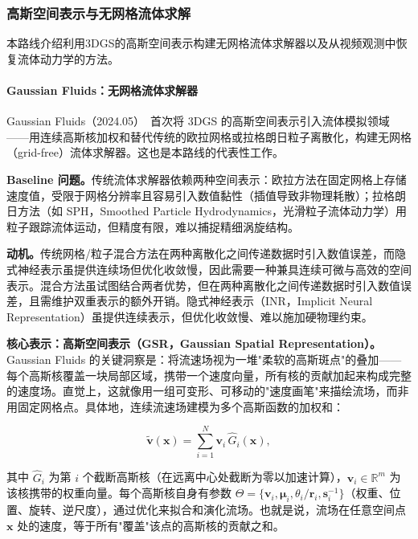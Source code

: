 \subsubsection{高斯空间表示与无网格流体求解}

本路线介绍利用3DGS的高斯空间表示构建无网格流体求解器以及从视频观测中恢复流体动力学的方法。

\paragraph{Gaussian Fluids：无网格流体求解器}

Gaussian Fluids（2024.05）~\cite{2405_18133}首次将 3DGS 的高斯空间表示引入流体模拟领域——用连续高斯核加权和替代传统的欧拉网格或拉格朗日粒子离散化，构建无网格（grid-free）流体求解器。这也是本路线的代表性工作。

\textbf{Baseline 问题。}传统流体求解器依赖两种空间表示：欧拉方法在固定网格上存储速度值，受限于网格分辨率且容易引入数值黏性（插值导致非物理耗散）；拉格朗日方法（如 SPH，Smoothed Particle Hydrodynamics，光滑粒子流体动力学）用粒子跟踪流体运动，但精度有限，难以捕捉精细涡旋结构。

\textbf{动机。}传统网格/粒子混合方法在两种离散化之间传递数据时引入数值误差，而隐式神经表示虽提供连续场但优化收敛慢，因此需要一种兼具连续可微与高效的空间表示。混合方法虽试图结合两者优势，但在两种离散化之间传递数据时引入数值误差，且需维护双重表示的额外开销。隐式神经表示（INR，Implicit Neural Representation）虽提供连续表示，但优化收敛慢、难以施加硬物理约束。

\textbf{核心表示：高斯空间表示（GSR，Gaussian Spatial Representation）。}Gaussian Fluids 的关键洞察是：将流速场视为一堆"柔软的高斯斑点"的叠加——每个高斯核覆盖一块局部区域，携带一个速度向量，所有核的贡献加起来构成完整的速度场。直觉上，这就像用一组可变形、可移动的"速度画笔"来描绘流场，而非用固定网格点。具体地，连续流速场建模为多个高斯函数的加权和：

\begin{equation}
\tilde{\mathbf{v}}(\mathbf{x}) = \sum_{i=1}^{N} \mathbf{v}_i \, \hat{G}_i(\mathbf{x}),
\end{equation}

其中 $\hat{G}_i$ 为第 $i$ 个截断高斯核（在远离中心处截断为零以加速计算），$\mathbf{v}_i \in \mathbb{R}^m$ 为该核携带的权重向量。每个高斯核自身有参数 $\Theta = \{\mathbf{v}_i, \boldsymbol{\mu}_i, \theta_i/\mathbf{r}_i, \mathbf{s}_i^{-1}\}$（权重、位置、旋转、逆尺度），通过优化来拟合和演化流场。也就是说，流场在任意空间点 $\mathbf{x}$ 处的速度，等于所有"覆盖"该点的高斯核的贡献之和。

